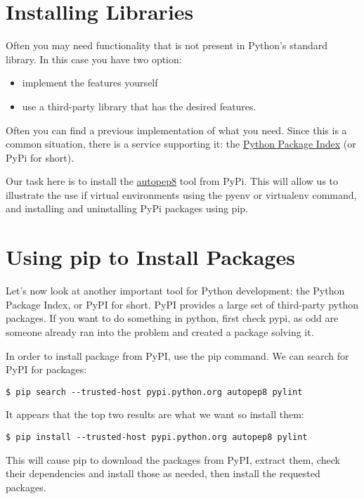 \section{Installing Libraries}\label{installing-libraries}

Often you may need functionality that is not present in Python's
standard library. In this case you have two option:

\begin{itemize}
\tightlist
\item
  implement the features yourself
\item
  use a third-party library that has the desired features.
\end{itemize}

Often you can find a previous implementation of what you need. Since
this is a common situation, there is a service supporting it: the
\href{https://pypi.python.org/pypi}{Python Package Index} (or PyPi for
short).

Our task here is to install the \href{}{autopep8} tool from PyPi. This
will allow us to illustrate the use if virtual environments using the
pyenv or virtualenv command, and installing and uninstalling PyPi
packages using pip.

\section{Using pip to Install
Packages}\label{using-pip-to-install-packages}

Let's now look at another important tool for Python development: the
Python Package Index, or PyPI for short. PyPI provides a large set of
third-party python packages. If you want to do something in python,
first check pypi, as odd are someone already ran into the problem and
created a package solving it.

In order to install package from PyPI, use the pip command. We can
search for PyPI for packages:

\begin{verbatim}
$ pip search --trusted-host pypi.python.org autopep8 pylint
\end{verbatim}

It appears that the top two results are what we want so install them:

\begin{verbatim}
$ pip install --trusted-host pypi.python.org autopep8 pylint
\end{verbatim}

This will cause pip to download the packages from PyPI, extract them,
check their dependencies and install those as needed, then install the
requested packages.

